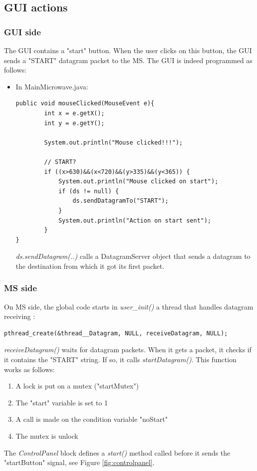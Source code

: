 \documentclass[12pt]{article}
\begin{document}
\subsection{GUI actions}\label{sec:GUIActions}
\subsubsection{GUI side}
The GUI contains a "start" button.  When the user clicks on this button, the GUI sends a "START" datagram packet to the MS. The GUI is indeed programmed as follows:
\begin{itemize}
\item In MainMicrowave.java:
\begin{lstlisting}
public void mouseClicked(MouseEvent e){
        int x = e.getX();
        int y = e.getY();

        System.out.println("Mouse clicked!!!");

        // START?
        if ((x>630)&&(x<720)&&(y>335)&&(y<365)) {
            System.out.println("Mouse clicked on start");
            if (ds != null) {
                ds.sendDatagramTo("START");
            }
            System.out.println("Action on start sent");
        }
}
\end{lstlisting}
\textit{ds.sendDatagram(..)} calls a DatagramServer object that sends a datagram to the destination from which it got its first packet.
\end{itemize}
\subsubsection{MS side}
On MS side, the global code starts in  \textit{user\_init()} a thread that handles datagram receiving :
\begin{lstlisting}
pthread_create(&thread__Datagram, NULL, receiveDatagram, NULL);
\end{lstlisting}
\textit{receiveDatagram()} waits for datagram packets. When it gets a packet, it checks if it contains the "START" string. If so, it calls \textit{startDatagram()}.  This function works as follows:
\begin{enumerate}
\item A lock is put on a mutex ("startMutex")
\item The "start" variable is set to 1
\item A call is made on the condition variable "noStart"
\item The mutex is unlock
\end{enumerate}
The \textit{ControlPanel} block defines a \textit{start()} method called before it sends the "startButton" signal, see Figure \ref{fig:controlpanel}.
\end{document}
